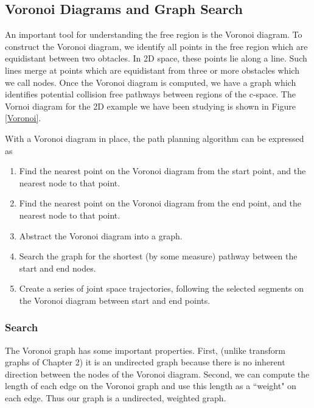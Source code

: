 \subsection{Voronoi Diagrams and Graph Search} \label{VoronoiAndGraph}

An important tool for understanding the free region is the Voronoi diagram.  To construct the Voronoi diagram, we identify all points in the free region which are equidistant between two obtacles.  In 2D space, these points lie along a line.   Such lines merge at points which are equidistant from three or more obstacles which we call nodes.  Once the Voronoi diagram is computed, we have a graph which identifies potential collision free pathways between regions of the c-space.   The Vornoi diagram for the 2D example we have been studying is shown in Figure \ref{Voronoi}.

With a Voronoi diagram in place, the path planning algorithm can be expressed as
\begin{enumerate} 

 \item Find the nearest point on the Voronoi diagram from the start point, and the nearest node to that point. 

 \item Find the nearest point on the Voronoi diagram from the end point, and the nearest node to that point. 

 \item Abstract the Voronoi diagram into a graph.

 \item Search the graph for the shortest (by some measure) pathway between the start and end nodes. 

 \item Create a series of joint space trajectories, following the selected segments on the Voronoi diagram between start and end points. 

\end{enumerate}


\subsubsection{Search}

The Voronoi graph has some important properties. First, (unlike transform graphs of Chapter 2)  it is an undirected graph because there is no inherent direction between the nodes of the Voronoi diagram.   Second, we can compute the length of each edge on the Voronoi graph and use this length as a ``weight" on each edge.  Thus our graph is a undirected, weighted graph. 


